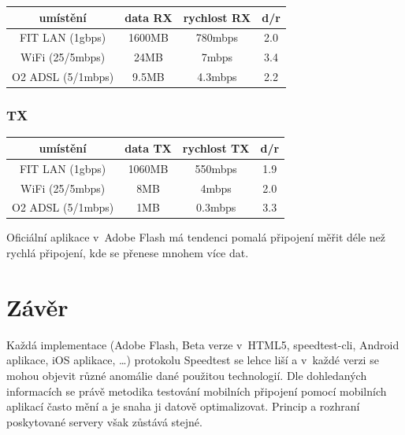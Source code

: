 \documentclass[12pt,a4paper]{article}
\begin{document}
\begin{center}
\begin{tabular}{ | c || c | c | c | }
\hline
umístění &  data RX & rychlost RX & d/r \\
\hline
\hline
FIT LAN (1gbps)      & 1600MB & 780mbps & 2.0 	\\ \hline
WiFi (25/5mbps)      & 24MB   & 7mbps   & 3.4	\\ \hline
O2 ADSL (5/1mbps)    & 9.5MB  & 4.3mbps & 2.2	\\ \hline

\end{tabular}
\end{center}

\subsubsection{TX}

\begin{center}
\begin{tabular}{ | c || c | c | c | }
\hline
umístění &  data TX & rychlost TX & d/r	\\
\hline
\hline
FIT LAN (1gbps)      & 1060MB & 550mbps & 1.9	  \\ \hline
WiFi (25/5mbps)      & 8MB    & 4mbps   & 2.0	  \\ \hline
O2 ADSL (5/1mbps)    & 1MB    & 0.3mbps & 3.3	  \\ \hline

\end{tabular}
\end{center}


\bigskip

Oficiální aplikace v~Adobe Flash má tendenci pomalá připojení měřit déle než rychlá připojení, kde se přenese mnohem více dat.

\pagebreak

\section{Závěr}

Každá implementace (Adobe Flash, Beta verze v~HTML5, speedtest-cli, Android aplikace, iOS aplikace, \ldots) protokolu Speedtest se lehce liší a v~každé verzi se mohou objevit různé anomálie dané použitou technologií. Dle dohledaných informacích se právě metodika testování mobilních připojení pomocí mobilních aplikací často mění a je snaha ji datově optimalizovat. Princip a rozhraní poskytované servery však zůstává stejné.
\end{document}

